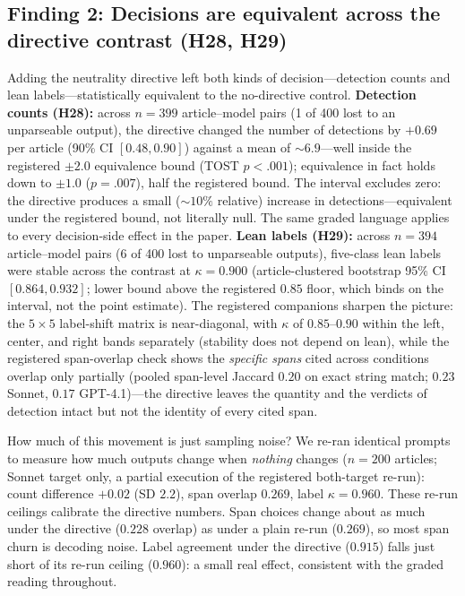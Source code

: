 \documentclass{article}
\newcommand{\kap}{\kappa}
\begin{document}
\subsection{Finding 2: Decisions are equivalent across the directive contrast (H28, H29)}
Adding the neutrality directive left both kinds of decision---detection
counts and lean labels---statistically
equivalent to the no-directive control. \textbf{Detection counts (H28):}
across $n{=}399$ article--model pairs (1 of 400 lost to
an unparseable output), the directive changed
the number of detections by $+0.69$ per article (90\% CI $[0.48, 0.90]$)
against a mean of ${\sim}6.9$---well inside the registered $\pm 2.0$
equivalence bound (TOST $p < .001$); equivalence in fact holds down to
$\pm1.0$ ($p=.007$), half the registered bound. The interval excludes zero: the directive produces a small
(${\sim}10\%$ relative) increase in detections---equivalent under the
registered bound, not literally null. The same graded language applies to every
decision-side effect in the paper. \textbf{Lean labels (H29):}
across $n{=}394$ article--model pairs (6 of 400 lost to unparseable outputs),
five-class lean labels were stable across
the contrast at $\kap = 0.900$ (article-clustered bootstrap 95\% CI
$[0.864, 0.932]$; lower bound above the registered $0.85$ floor, which
binds on the interval, not the point estimate). The registered
companions sharpen the picture: the $5\times5$ label-shift matrix is
near-diagonal, with $\kap$ of $0.85$--$0.90$ within the left, center,
and right bands separately (stability does not depend on lean), while the registered span-overlap
check shows the \emph{specific spans} cited across conditions overlap only
partially (pooled span-level Jaccard $0.20$ on exact string match;
$0.23$ Sonnet, $0.17$ GPT-4.1)---the directive leaves the quantity and
the verdicts of detection intact but not the identity of every cited
span.

How much of this movement is just sampling noise? We re-ran identical
prompts to measure how much outputs change when \emph{nothing} changes
($n{=}200$ articles; Sonnet target only, a partial execution of
the registered both-target re-run): count difference $+0.02$ (SD
$2.2$), span overlap $0.269$, label $\kap = 0.960$. These re-run
ceilings calibrate the directive numbers. Span choices change about as
much under the directive ($0.228$ overlap) as under a plain re-run
($0.269$), so most span churn is decoding noise. Label agreement under
the directive ($0.915$) falls just short of its re-run ceiling
($0.960$): a small real effect, consistent with the graded reading
throughout.
\end{document}
